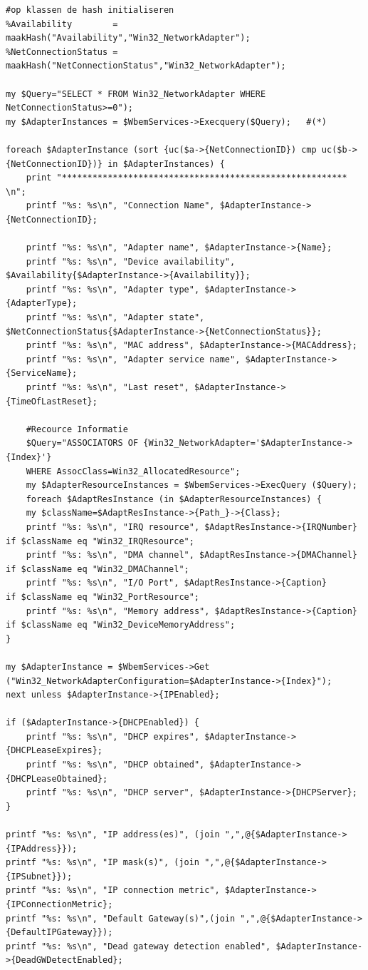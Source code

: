 \documentclass[11pt,a4paper]{report}
\begin{document}
\begin{enumerate}[resume]
\begin{lstlisting}
#op klassen de hash initialiseren
%Availability        = maakHash("Availability","Win32_NetworkAdapter");
%NetConnectionStatus = maakHash("NetConnectionStatus","Win32_NetworkAdapter");

my $Query="SELECT * FROM Win32_NetworkAdapter WHERE NetConnectionStatus>=0"); 
my $AdapterInstances = $WbemServices->Execquery($Query);   #(*)

foreach $AdapterInstance (sort {uc($a->{NetConnectionID}) cmp uc($b->{NetConnectionID})} in $AdapterInstances) {
	print "******************************************************** \n";
	printf "%s: %s\n", "Connection Name", $AdapterInstance->{NetConnectionID};
	
	printf "%s: %s\n", "Adapter name", $AdapterInstance->{Name};
	printf "%s: %s\n", "Device availability", $Availability{$AdapterInstance->{Availability}};
	printf "%s: %s\n", "Adapter type", $AdapterInstance->{AdapterType};
	printf "%s: %s\n", "Adapter state", $NetConnectionStatus{$AdapterInstance->{NetConnectionStatus}};
	printf "%s: %s\n", "MAC address", $AdapterInstance->{MACAddress};
	printf "%s: %s\n", "Adapter service name", $AdapterInstance->{ServiceName};
	printf "%s: %s\n", "Last reset", $AdapterInstance->{TimeOfLastReset};
	
	#Recource Informatie
	$Query="ASSOCIATORS OF {Win32_NetworkAdapter='$AdapterInstance->{Index}'} 
	WHERE AssocClass=Win32_AllocatedResource";
	my $AdapterResourceInstances = $WbemServices->ExecQuery ($Query);
	foreach $AdaptResInstance (in $AdapterResourceInstances) {
	my $className=$AdaptResInstance->{Path_}->{Class};
	printf "%s: %s\n", "IRQ resource", $AdaptResInstance->{IRQNumber} if $className eq "Win32_IRQResource";
	printf "%s: %s\n", "DMA channel", $AdaptResInstance->{DMAChannel} if $className eq "Win32_DMAChannel";
	printf "%s: %s\n", "I/O Port", $AdaptResInstance->{Caption}       if $className eq "Win32_PortResource";
	printf "%s: %s\n", "Memory address", $AdaptResInstance->{Caption} if $className eq "Win32_DeviceMemoryAddress";
}

my $AdapterInstance = $WbemServices->Get ("Win32_NetworkAdapterConfiguration=$AdapterInstance->{Index}");
next unless $AdapterInstance->{IPEnabled};

if ($AdapterInstance->{DHCPEnabled}) {
	printf "%s: %s\n", "DHCP expires", $AdapterInstance->{DHCPLeaseExpires};
	printf "%s: %s\n", "DHCP obtained", $AdapterInstance->{DHCPLeaseObtained};
	printf "%s: %s\n", "DHCP server", $AdapterInstance->{DHCPServer};
}

printf "%s: %s\n", "IP address(es)", (join ",",@{$AdapterInstance->{IPAddress}});
printf "%s: %s\n", "IP mask(s)", (join ",",@{$AdapterInstance->{IPSubnet}});
printf "%s: %s\n", "IP connection metric", $AdapterInstance->{IPConnectionMetric};
printf "%s: %s\n", "Default Gateway(s)",(join ",",@{$AdapterInstance->{DefaultIPGateway}});
printf "%s: %s\n", "Dead gateway detection enabled", $AdapterInstance->{DeadGWDetectEnabled};


\end{lstlisting}
\end{enumerate}
\end{document}
